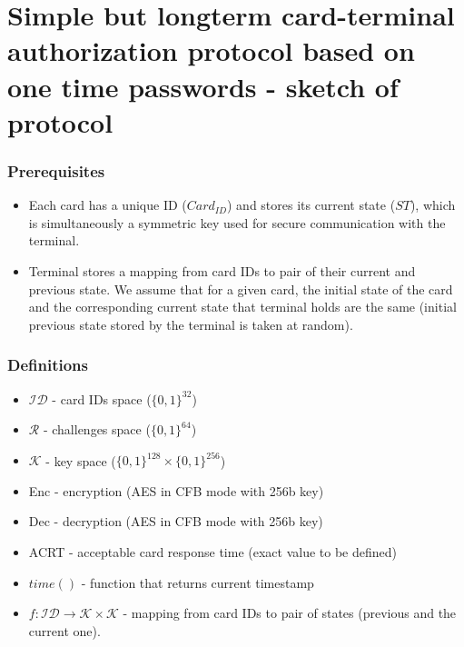 \documentclass[10pt,titlepage]{article}
\begin{document}
\section*{Simple but longterm card-terminal authorization protocol based on one time passwords - sketch of protocol}

\subsubsection*{Prerequisites}

\begin{itemize}
	\item  Each card has a unique ID ($Card_{ID}$) and stores its current state ($ST$), which is simultaneously a symmetric key used for secure communication with the terminal.
	\item Terminal stores a mapping from card IDs to pair of their current and previous state. We assume that for a given card, the initial state of the card and the corresponding current state that terminal holds are the same (initial previous state stored by the terminal is taken at random).
\end{itemize}

\subsubsection*{Definitions}

\begin{itemize}
	\item $\mathcal{ID}$  - card IDs space ($\{0,1\}^{32}$)
	\item $\mathcal{R}$   - challenges space ($\{0,1\}^{64}$)
	\item $\mathcal{K}$   - key space ($\{0,1\}^{128} \times \{0,1\}^{256}$)
	\item Enc - encryption (AES in CFB mode with 256b key)
	\item Dec - decryption (AES in CFB mode with 256b key)
	\item ACRT - acceptable card response time (exact value to be defined)
	\item $time()$ - function that returns current timestamp
	\item $f : \mathcal{ID} \rightarrow \mathcal{K} \times \mathcal{K}$ - mapping from card IDs to pair of states (previous and the current one).
\end{itemize}
\end{document}
